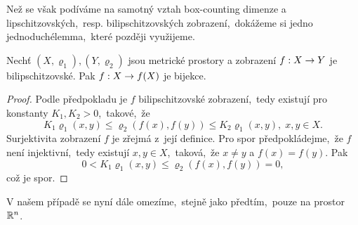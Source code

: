 Než se však podíváme na samotný vztah box-counting dimenze a lipschitzovských,~resp. bilipschitzovských zobrazení,~dokážeme si jedno jednoduché\linebreak{}lemma,~které později využijeme.
\begin{lemma}\label{lem:lipschitzovska-zobrazeni-a-bijekce}
    Nechť $(X,\varrho_1),(Y,\varrho_2)$ jsou metrické prostory a zobrazení $f:X \rightarrow Y$ je bilipschitzovské. Pak $f:X \rightarrow f(X)$ je bijekce.
\end{lemma}
\begin{proof}
    Podle předpokladu je $f$ bilipschitzovské zobrazení,~tedy existují pro konstanty $K_1,K_2>0$,~takové,~že
    \[K_1\varrho_1(x,y)\leqslant\varrho_2(f(x),f(y))\leqslant K_2\varrho_1(x,y),\;x,y\in X.\]
    Surjektivita zobrazení $f$ je zřejmá z~její definice. Pro spor předpokládejme,~že $f$ není injektivní,~tedy existují $x,y\in X$,~taková,~že $x\neq y$ a $f(x)=f(y)$. Pak
    \[0<K_1\varrho_1(x,y)\leqslant\varrho_2(f(x),f(y))=0,\]
    což je spor.
\end{proof}

V našem případě se nyní dále omezíme,~stejně jako předtím,~pouze na prostor $\mathbb{R}^n$.

